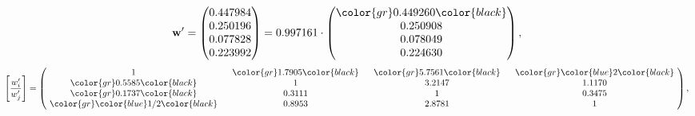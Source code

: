 \begin{example}
\begin{equation*}
\mathbf{w}^{\prime} =
\begin{pmatrix}
0.447984\\
0.250196\\
0.077828\\
0.223992
\end{pmatrix} =
0.997161\cdot
\begin{pmatrix}
\color{gr} 0.449260\color{black} \\
0.250908\\
0.078049\\
0.224630
\end{pmatrix},
\end{equation*}
\begin{equation*}
\left[ \frac{{w}^{\prime}_i}{{w}^{\prime}_j} \right] =
\begin{pmatrix}
$\,\,$ 1 $\,\,$ & $\,\,$\color{gr} 1.7905\color{black} $\,\,$ & $\,\,$\color{gr} 5.7561\color{black} $\,\,$ & $\,\,$\color{gr} \color{blue} 2\color{black} $\,\,$ \\
$\,\,$\color{gr} 0.5585\color{black} $\,\,$ & $\,\,$ 1 $\,\,$ & $\,\,$3.2147$\,\,$ & $\,\,$1.1170  $\,\,$ \\
$\,\,$\color{gr} 0.1737\color{black} $\,\,$ & $\,\,$0.3111$\,\,$ & $\,\,$ 1 $\,\,$ & $\,\,$0.3475 $\,\,$ \\
$\,\,$\color{gr} \color{blue}  1/2\color{black} $\,\,$ & $\,\,$0.8953$\,\,$ & $\,\,$2.8781$\,\,$ & $\,\,$ 1  $\,\,$ \\
\end{pmatrix},
\end{equation*}
\end{example}
\newpage
